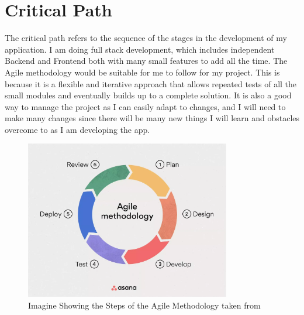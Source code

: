 \pagebreak

\section{Critical Path}
The critical path refers to the sequence of the stages in the development of my application. I am doing full stack development, which includes independent Backend and Frontend both with many small features to add all the time. The Agile methodology would be suitable for me to follow for my project. This is because it is a flexible and iterative approach that allows repeated tests of all the small modules and eventually builds up to a complete solution. It is also a good way to manage the project as I can easily adapt to changes, and I will need to make many changes since there will be many new things I will learn and obstacles overcome to as I am developing the app.

\bigskip

\begin{figure}[H]
    \centering
    \includegraphics[width=0.8\textwidth]{Assets/Agile_asana.png}
    \caption{Imagine Showing the Steps of the Agile Methodology taken from \cite{laoyan2024agile}}
    \label{fig:critical_path}
\end{figure}